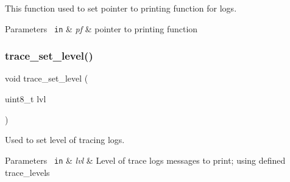 This function used to set pointer to printing function for logs. 


\begin{DoxyParams}[1]{Parameters}
\mbox{\texttt{ in}}  & {\em pf} & pointer to printing function \\
\hline
\end{DoxyParams}
\mbox{\label{group__dbg__logs__group__functions_ga6659e7cfd41f22f3d2c070c4c1156da4}} 
\subsubsection{\texorpdfstring{trace\_set\_level()}{trace\_set\_level()}}
{\footnotesize\ttfamily void trace\+\_\+set\+\_\+level (\begin{DoxyParamCaption}\item[{uint8\+\_\+t}]{lvl }\end{DoxyParamCaption})}



Used to set level of tracing logs. 


\begin{DoxyParams}[1]{Parameters}
\mbox{\texttt{ in}}  & {\em lvl} & Level of trace logs messages to print; using defined trace\+\_\+levels \\
\hline
\end{DoxyParams}
